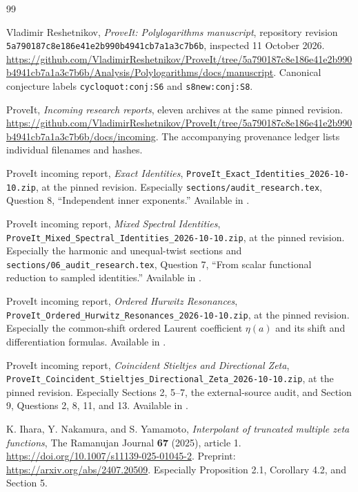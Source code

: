 \documentclass[11pt]{article}
\numberwithin{equation}{section}
\theoremstyle{plain}
\theoremstyle{definition}
\theoremstyle{remark}
\newcommand{\src}[1]{\nolinkurl{#1}}
\begin{document}


{}
\begin{thebibliography}{99}
\small
\raggedright

Vladimir Reshetnikov, \emph{ProveIt: Polylogarithms manuscript},
repository revision \texttt{5a790187c8e186e41e2b990b4941cb7a1a3c7b6b},
inspected 11 October 2026.
\url{https://github.com/VladimirReshetnikov/ProveIt/tree/5a790187c8e186e41e2b990b4941cb7a1a3c7b6b/Analysis/Polylogarithms/docs/manuscript}.
Canonical conjecture labels \src{cycloquot:conj:S6} and
\src{s8new:conj:S8}.

ProveIt, \emph{Incoming research reports}, eleven archives at the
same pinned revision.
\url{https://github.com/VladimirReshetnikov/ProveIt/tree/5a790187c8e186e41e2b990b4941cb7a1a3c7b6b/docs/incoming}.
The accompanying provenance ledger lists individual filenames and hashes.

ProveIt incoming report, \emph{Exact Identities},
\src{ProveIt_Exact_Identities_2026-10-10.zip}, at the pinned revision.
Especially \src{sections/audit_research.tex}, Question 8,
``Independent inner exponents.'' Available in \cite{RepoIncoming}.

ProveIt incoming report, \emph{Mixed Spectral Identities},
\src{ProveIt_Mixed_Spectral_Identities_2026-10-10.zip}, at the pinned
revision. Especially the harmonic and unequal-twist sections and
\src{sections/06_audit_research.tex}, Question 7,
``From scalar functional reduction to sampled identities.''
Available in \cite{RepoIncoming}.

ProveIt incoming report, \emph{Ordered Hurwitz Resonances},
\src{ProveIt_Ordered_Hurwitz_Resonances_2026-10-10.zip}, at the pinned
revision. Especially the common-shift ordered Laurent coefficient
$\eta(a)$ and its shift and differentiation formulas.
Available in \cite{RepoIncoming}.

ProveIt incoming report, \emph{Coincident Stieltjes and Directional Zeta},
\src{ProveIt_Coincident_Stieltjes_Directional_Zeta_2026-10-10.zip},
at the pinned revision. Especially Sections 2, 5--7, the external-source
audit, and Section 9, Questions 2, 8, 11, and 13.
Available in \cite{RepoIncoming}.


K. Ihara, Y. Nakamura, and S. Yamamoto,
\emph{Interpolant of truncated multiple zeta functions},
The Ramanujan Journal \textbf{67} (2025), article 1.
\url{https://doi.org/10.1007/s11139-025-01045-2}.
Preprint: \url{https://arxiv.org/abs/2407.20509}.
Especially Proposition 2.1, Corollary 4.2, and Section 5.


\end{thebibliography}
\end{document}

